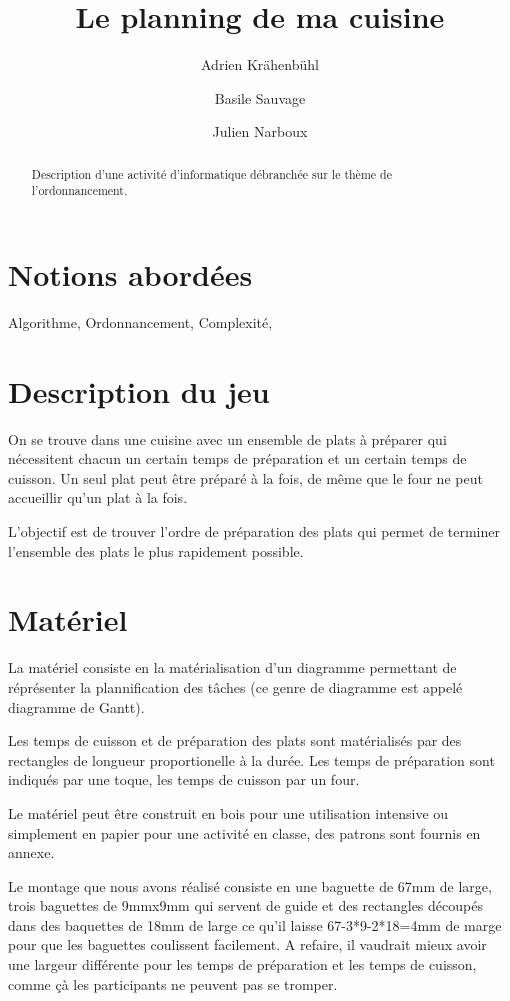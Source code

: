 \documentclass[a4paper]{article}
\title{Le planning de ma cuisine}
\author{Adrien Krähenbühl \and Basile Sauvage \and Julien Narboux}
\begin{document}
\maketitle

\begin{abstract}
Description d'une activité d'informatique débranchée sur le thème de l'ordonnancement.
\end{abstract}


\section{Notions abordées}

Algorithme, Ordonnancement, Complexité, 

\section{Description du jeu}

On se trouve dans une cuisine avec un ensemble de plats à préparer qui nécessitent chacun un certain temps de préparation et un certain temps de cuisson. Un seul plat peut être préparé à la fois, de même que le four ne peut accueillir qu'un plat à la fois.

L'objectif est de trouver l'ordre de préparation des plats qui permet de terminer l'ensemble des plats le plus rapidement possible.

\section{Matériel}

La matériel consiste en la matérialisation d'un diagramme permettant de réprésenter la plannification des tâches (ce genre de diagramme est appelé diagramme de Gantt).

Les temps de cuisson et de préparation des plats sont matérialisés par des rectangles de longueur proportionelle à la durée. Les temps de préparation sont indiqués par une toque, les temps de cuisson par un four.

Le matériel peut être construit en bois pour une utilisation intensive ou simplement en papier pour une activité en classe, des patrons sont fournis en annexe.

Le montage que nous avons réalisé consiste en une baguette de 67mm de large, trois baguettes de 9mmx9mm qui servent de guide et des rectangles découpés dans des baquettes de 18mm de large ce qu'il laisse 67-3*9-2*18=4mm de marge pour que les baguettes coulissent facilement. A refaire, il vaudrait mieux avoir une largeur différente pour les temps de préparation et les temps de cuisson, comme çà les participants ne peuvent pas se tromper.
\end{document}

